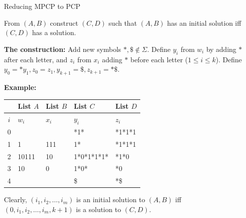 \documentclass[handout]{beamer}
\begin{document}
\begin{frame}{Reducing MPCP to PCP}

    From $(A,B)$ construct $(C,D)$ such that $(A,B)$ has an initial solution iff $(C,D)$ has a solution.

    \textbf{The construction:} Add new symbols $*,\$\notin \Sigma$. Define $y_i$ from $w_i$ by adding $*$ after each letter, and $z_i$ from $x_i$ adding $*$ before each letter ($1\leq i\leq k$). Define $y_0=*y_1,z_0=z_1,y_{k+1}=\$,z_{k+1}=*\$$.
    
    \textbf{Example:}

    \vspace{-20pt}
    \begin{center}\small
        \begin{tabular}{c | l | l || l | l}
             & List $A$ & List $B$ & List $C$ & List $D$\\
            \hline
            $i$ & $w_i$ & $x_i$ & $y_i$ & $z_i$ \\
            \hline
            0 & & & *1* & *1*1*1\\
            1 & 1 & 111 & 1* & *1*1*1\\
            2 & 10111 & 10 & 1*0*1*1*1* & *1*0\\
            3 & 10 & 0 & 1*0* & *0\\
            4 & & & \$ & *\$ 
        \end{tabular}
    \end{center}
    Clearly, $({i_1}, {i_2}, \ldots, {i_m})$ is an initial solution to $(A,B)$ iff $(0,{i_1}, {i_2}, \ldots, {i_m},k+1)$ is a solution to $(C,D)$.\hfill\qedsymbol

\end{frame}
\end{document}

